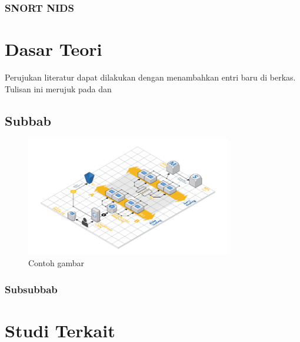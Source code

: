     \subsubsection{SNORT NIDS}

\section{Dasar Teori}
Perujukan literatur dapat dilakukan dengan menambahkan entri baru di berkas. Tulisan ini merujuk pada \parencite{knuth2001art} dan \parencite{4026885}

  \subsection{Subbab}

  \blindtext

  \begin{figure}[h]
    \centering
    \includegraphics[width=0.8\textwidth]{resources/chapter-2-infrastructure-diagram.png}
    \caption{Contoh gambar}
  \end{figure}

  \subsubsection{Subsubbab}

  \blindtext

\section{Studi Terkait}
\blindtext
